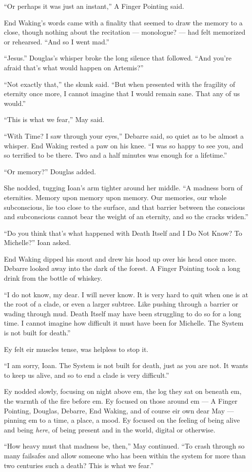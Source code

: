 ``Or perhaps it was just an instant,'' A Finger Pointing said.

End Waking's words came with a finality that seemed to draw the memory to a close, though nothing about the recitation — monologue? — had felt memorized or rehearsed. ``And so I went mad.''

``Jesus.'' Douglas's whisper broke the long silence that followed. ``And you're afraid that's what would happen on Artemis?''

``Not exactly that,'' the skunk said. ``But when presented with the fragility of eternity once more, I cannot imagine that I would remain sane. That any of us would.''

``This is what we fear,'' May said.

``With Time? I saw through your eyes,'' Debarre said, so quiet as to be almost a whisper. End Waking rested a paw on his knee. ``I was so happy to see you, and so terrified to be there. Two and a half minutes was enough for a lifetime.''

``Or memory?'' Douglas added.

She nodded, tugging Ioan's arm tighter around her middle. ``A madness born of eternities. Memory upon memory upon memory. Our memories, our whole subconscious, lie too close to the surface, and that barrier between the conscious and subconscious cannot bear the weight of an eternity, and so the cracks widen.''

``Do you think that's what happened with Death Itself and I Do Not Know? To Michelle?'' Ioan asked.

End Waking dipped his snout and drew his hood up over his head once more. Debarre looked away into the dark of the forest. A Finger Pointing took a long drink from the bottle of whiskey.

``I do not know, my dear. I will never know. It is very hard to quit when one is at the root of a clade, or even a larger subtree. Like pushing through a barrier or wading through mud. Death Itself may have been struggling to do so for a long time. I cannot imagine how difficult it must have been for Michelle. The System is not built for death.''

Ey felt eir muscles tense, was helpless to stop it.

``I am sorry, Ioan. The System is not built for death, just as you are not. It wants to keep us alive, and so to end a clade is very difficult.''

Ey nodded slowly, focusing on night above em, the log they sat on beneath em, the warmth of the fire before em. Ey focused on those around em — A Finger Pointing, Douglas, Debarre, End Waking, and of course eir own dear May — pinning em to a time, a place, a mood. Ey focused on the feeling of being alive and being \emph{here}, of being present and in the world, digital or otherwise.

``How heavy must that madness be, then,'' May continued. ``To crash through so many failsafes and allow someone who has been within the system for more than two centuries such a death? This is what we fear.''
